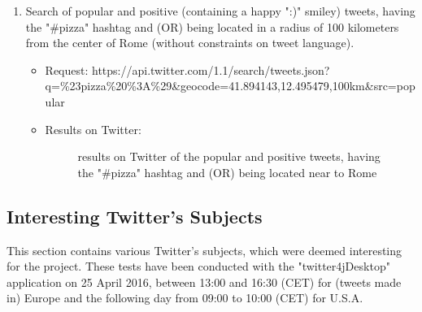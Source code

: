 \documentclass[a4paper,11pt]{report}
\begin{document}
\begin{enumerate}
	\item Search of popular and positive (containing a happy ":)" smiley) tweets, having the "\#pizza" hashtag and (OR) being located in a radius of 100 kilometers from the center of Rome (without constraints on tweet language).
	\begin{itemize}
		\item Request: https://api.twitter.com/1.1/search/tweets.json?\\q=\%23pizza\%20\%3A\%29\&geocode=41.894143,12.495479,100km\&src=popular
		\item Results on Twitter:
		\begin{figure}[H]
		\vspace{-5pt}
		\begin{center}
		\vspace{-5pt}
		\caption{results on Twitter of the popular and positive tweets, having the "\#pizza" hashtag and (OR) being located near to Rome}
		\end{center}
		\end{figure}
		\vspace{-20pt}
	\end{itemize}
\end{enumerate}
\newpage

\subsection{Interesting Twitter's Subjects}
\label{interestingTwitterSubjects}
This section contains various Twitter's subjects, which were deemed interesting for the project. These tests have been conducted with the "twitter4jDesktop" application on 25 April 2016, between 13:00 and 16:30 (CET) for (tweets made in) Europe and the following day from 09:00 to 10:00 (CET) for U.S.A.
\end{document}
